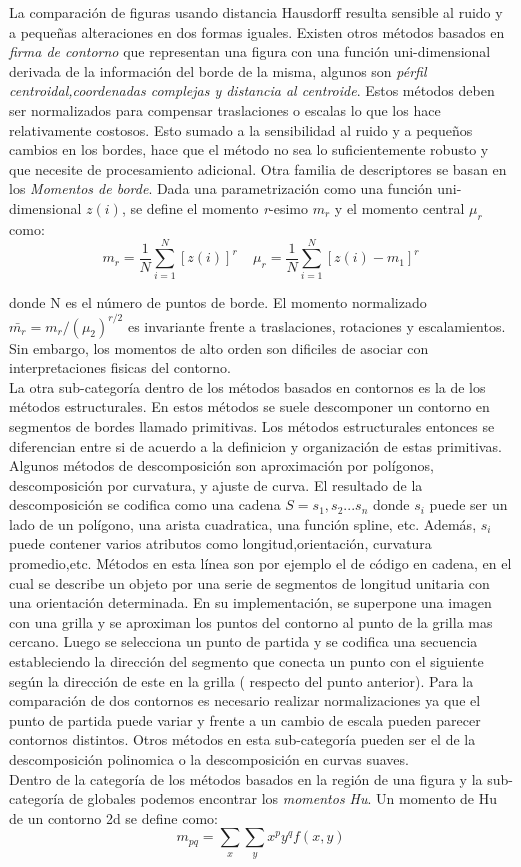 La comparación de figuras usando distancia Hausdorff resulta sensible 
al ruido y a pequeñas alteraciones en dos formas iguales. Existen otros métodos basados
en \textit{firma de contorno} que  representan una figura con una 
función uni-dimensional derivada de la información del borde de la 
misma, 
algunos son \textit{pérfil centroidal,coordenadas complejas y distancia al centroide}. Estos métodos deben ser normalizados para compensar
traslaciones o escalas lo que los hace relativamente costosos. Esto sumado a la sensibilidad al ruido y a pequeños cambios en los bordes, hace que el método 
no sea lo suficientemente robusto y que necesite de procesamiento adicional. Otra familia de descriptores se basan en los 
\textit{Momentos de borde}. Dada una parametrización como una función 
uni-dimensional $z(i)$, se define el momento \textit{r}-esimo \textit{$m_r$} 
y el momento central $\mu_r$ como:
\[
	m_r=\frac{1}{N} \sum_{i=1}^{N}{[z(i)]^r}\ \ \ \ \
	\mu_r=\frac{1}{N} \sum_{i=1}^{N}{[z(i) - m_1]^r}
\]

donde N es el número de puntos de borde. El momento normalizado $\bar{m_r}=m_r / (\mu_2)^{r/2}$
es invariante frente a traslaciones, rotaciones y escalamientos. Sin 
embargo, los momentos de alto orden
son dificiles de asociar con interpretaciones fisicas del contorno.\\
\indent La otra sub-categoría dentro de los métodos basados en contornos es la de los métodos estructurales.
En estos métodos se suele descomponer un contorno en segmentos de bordes llamado primitivas. Los métodos estructurales
entonces se diferencian entre si de acuerdo a la definicion y organización de estas primitivas. Algunos métodos
de descomposición son aproximación por polígonos, descomposición por curvatura, y ajuste de curva. El resultado
de la descomposición se codifica como una cadena $S=s_1,s_2...s_n$ donde $s_i$ puede ser un lado de un polígono, una 
arista cuadratica, una función spline, etc. Además, $s_i$ puede contener varios atributos como longitud,orientación, curvatura promedio,etc.
Métodos en esta línea son por ejemplo el de código en cadena, en el cual se describe un objeto por una serie de segmentos de longitud unitaria
con una orientación determinada. En su implementación, se superpone una imagen con una grilla y se aproximan los puntos del contorno al 
punto de la grilla mas cercano. Luego se selecciona un punto de 
partida y se codifica una secuencia estableciendo la dirección del segmento
que conecta un punto con el siguiente según la dirección de este en 
la grilla ( respecto del punto  anterior). Para la comparación de dos
contornos es necesario realizar normalizaciones ya que el punto de 
partida puede variar y frente a un cambio de escala pueden parecer 
contornos distintos. Otros métodos en esta sub-categoría pueden ser el de la descomposición polinomica o la descomposición en curvas suaves. \\
\indent Dentro de la categoría de los métodos basados en la región 
de una figura y la sub-categoría de globales podemos encontrar los \textit{momentos Hu}.
Un momento de Hu de un contorno 2d se define como:
\[
	m_{pq}=\sum_{x}{\sum_{y}{x^py^qf(x,y)}}
\]


